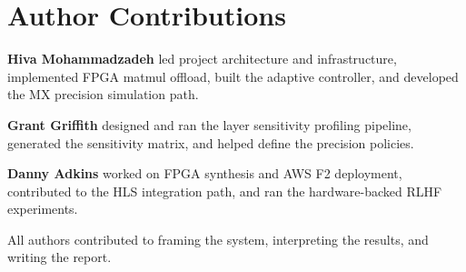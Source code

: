 \documentclass[11pt,a4paper]{article}
\begin{document}
\section*{Author Contributions}

\textbf{Hiva Mohammadzadeh} led project architecture and infrastructure, implemented FPGA matmul offload, built the adaptive controller, and developed the MX precision simulation path.

\textbf{Grant Griffith} designed and ran the layer sensitivity profiling pipeline, generated the sensitivity matrix, and helped define the precision policies.

\textbf{Danny Adkins} worked on FPGA synthesis and AWS F2 deployment, contributed to the HLS integration path, and ran the hardware-backed RLHF experiments.

All authors contributed to framing the system, interpreting the results, and writing the report.
\end{document}
